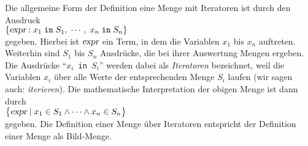 Die allgemeine Form der Definition eine Menge mit Iteratoren ist durch den Ausdruck
\\[0.2cm]
\hspace*{1.3cm} 
$\{ \textsl{expr} : x_1 \;\mathtt{in}\; S_1,\; \cdots,\; x_n \;\mathtt{in}\; S_n \}$ 
\\[0.2cm]
gegeben.
Hierbei ist $\textsl{expr}$ ein Term, in dem die Variablen $x_1$ bis $x_n$
auftreten.  Weiterhin sind
$S_1$ bis $S_n$ Ausdrücke, die bei ihrer Auswertung Mengen ergeben.  Die
Ausdrücke ``\texttt{$x_i$ in $S_i$}'' werden dabei als \emph{Iteratoren} bezeichnet,
weil die Variablen $x_i$ über alle Werte der entsprechenden Menge $S_i$ laufen
(wir  sagen auch: \emph{iterieren}).
Die mathematische Interpretation der obigen Menge ist dann durch \\[0.2cm]
\hspace*{1.3cm} 
$\bigl\{ \textsl{expr} \mid x_1 \in S_1 \wedge \cdots \wedge x_n \in S_n \bigr\}$ 
\\[0.2cm]
gegeben.  Die Definition einer Menge über Iteratoren entspricht  der
Definition einer Menge als Bild-Menge.

